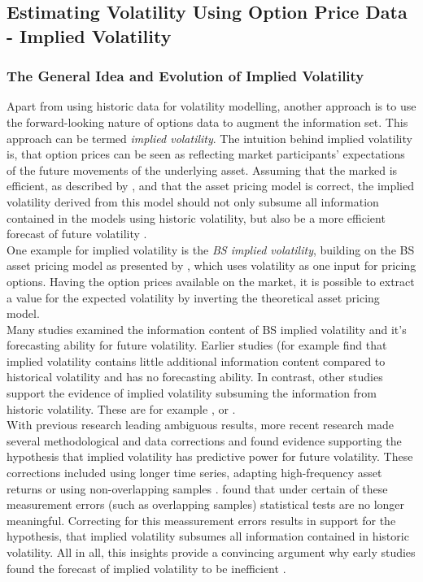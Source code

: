 \subsection{Estimating Volatility Using Option Price Data - Implied Volatility}
\subsubsection{The General Idea and Evolution of Implied Volatility}
Apart from using historic data for volatility modelling, another approach is to use the forward-looking nature of options data to augment the information set. This approach can be termed \emph{implied volatility}. The intuition behind implied volatility is, that option prices can be seen as reflecting market participants' expectations of the future movements of the underlying asset. Assuming that the marked is efficient, as described by \textcite{fama1970}, and that the asset pricing model is correct, the implied volatility derived from this model should not only subsume all information contained in the models using historic volatility, but also be a more efficient forecast of future volatility \parencite{jiang2003}. \\
One example for implied volatility is the \emph{\ac{BS} implied volatility}, building on the \ac{BS} asset pricing model as presented by \textcite{black1973}, which uses volatility as one input for pricing options. Having the option prices available on the market, it is possible to extract a value for the expected volatility by inverting the theoretical asset pricing model. \\
Many studies examined the information content of \ac{BS} implied volatility and it's forecasting ability for future volatility. Earlier studies (for example \textcite{canina1993} find that implied volatility contains little additional information content compared to historical volatility and has no forecasting ability. In contrast, other studies  support the evidence of implied volatility subsuming the information from historic volatility. These are for example \textcite{day1992}, \textcite{lamoureux1993} or \textcite{jorion1995}.\\
With previous research leading ambiguous results, more recent research made several methodological and data corrections and found evidence supporting the hypothesis that implied volatility has predictive power for future volatility. These corrections included using longer time series, adapting high-frequency asset returns or using non-overlapping samples \parencite{jiang2003}. \textcite{christensen2001} found that under certain of these measurement errors (such as overlapping samples) statistical tests are no longer meaningful. Correcting for this meassurement errors results in support for the hypothesis, that implied volatility subsumes all information contained in historic volatility. All in all, this insights provide a convincing argument why early studies found the forecast of implied volatility to be inefficient \parencite{jiang2003}. \\
